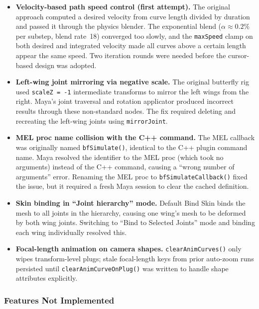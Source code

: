 \documentclass[12pt]{article}
\begin{document}
\begin{itemize}
  \item \textbf{Velocity-based path speed control (first attempt).} The
    original approach computed a desired velocity from curve length divided by
    duration and passed it through the physics blender. The exponential blend
    ($\alpha \approx 0.2\%$ per substep, blend rate~18) converged too slowly,
    and the \texttt{maxSpeed} clamp on both desired and integrated velocity
    made all curves above a certain length appear the same speed. Two
    iteration rounds were needed before the cursor-based design was adopted.

  \item \textbf{Left-wing joint mirroring via negative scale.} The original
    butterfly rig used \texttt{scaleZ = -1} intermediate transforms to mirror
    the left wings from the right. Maya's joint traversal and rotation
    applicator produced incorrect results through these non-standard nodes.
    The fix required deleting and recreating the left-wing joints using
    \texttt{mirrorJoint}.

  \item \textbf{MEL proc name collision with the C++ command.} The MEL
    callback was originally named \texttt{bfSimulate()}, identical to the C++
    plugin command name. Maya resolved the identifier to the MEL proc
    (which took no arguments) instead of the C++ command, causing a
    ``wrong number of arguments'' error. Renaming the MEL proc to
    \texttt{bfSimulateCallback()} fixed the issue, but it required a fresh
    Maya session to clear the cached definition.

  \item \textbf{Skin binding in ``Joint hierarchy'' mode.} Default Bind Skin
    binds the mesh to all joints in the hierarchy, causing one wing's mesh
    to be deformed by both wing joints. Switching to ``Bind to Selected
    Joints'' mode and binding each wing individually resolved this.

  \item \textbf{Focal-length animation on camera shapes.}
    \texttt{clearAnimCurves()} only wipes transform-level plugs; stale
    focal-length keys from prior auto-zoom runs persisted until
    \texttt{clearAnimCurveOnPlug()} was written to handle shape attributes
    explicitly.
\end{itemize}

\subsubsection{Features Not Implemented}
\end{document}
